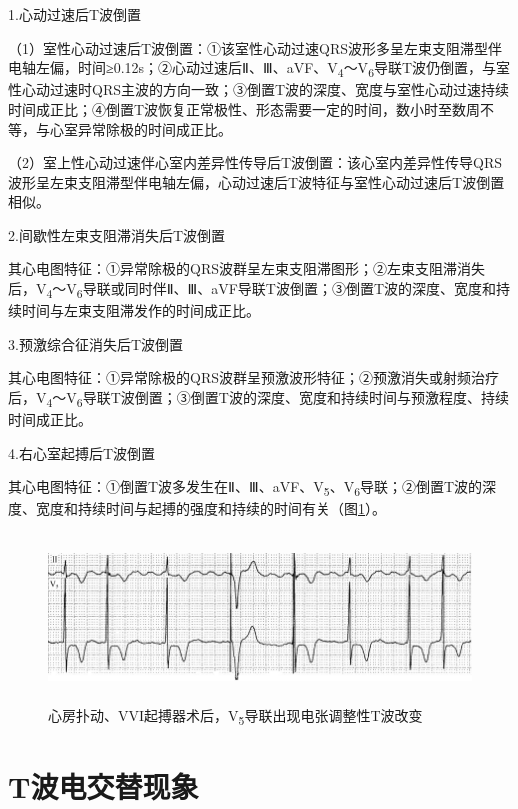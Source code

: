 1.心动过速后T波倒置

（1）室性心动过速后T波倒置：①该室性心动过速QRS波形多呈左束支阻滞型伴电轴左偏，时间≥0.12s；②心动过速后Ⅱ、Ⅲ、aVF、V\textsubscript{4}～V\textsubscript{6}导联T波仍倒置，与室性心动过速时QRS主波的方向一致；③倒置T波的深度、宽度与室性心动过速持续时间成正比；④倒置T波恢复正常极性、形态需要一定的时间，数小时至数周不等，与心室异常除极的时间成正比。

（2）室上性心动过速伴心室内差异性传导后T波倒置：该心室内差异性传导QRS波形呈左束支阻滞型伴电轴左偏，心动过速后T波特征与室性心动过速后T波倒置相似。

2.间歇性左束支阻滞消失后T波倒置

其心电图特征：①异常除极的QRS波群呈左束支阻滞图形；②左束支阻滞消失后，V\textsubscript{4}～V\textsubscript{6}导联或同时伴Ⅱ、Ⅲ、aVF导联T波倒置；③倒置T波的深度、宽度和持续时间与左束支阻滞发作的时间成正比。

3.预激综合征消失后T波倒置

其心电图特征：①异常除极的QRS波群呈预激波形特征；②预激消失或射频治疗后，V\textsubscript{4}～V\textsubscript{6}导联T波倒置；③倒置T波的深度、宽度和持续时间与预激程度、持续时间成正比。

4.右心室起搏后T波倒置

其心电图特征：①倒置T波多发生在Ⅱ、Ⅲ、aVF、V\textsubscript{5}、V\textsubscript{6}导联；②倒置T波的深度、宽度和持续时间与起搏的强度和持续的时间有关（图\ref{fig6-13}）。

\begin{figure}[!htbp]
 \centering
 \includegraphics[width=5.78125in,height=1.75in]{./images/Image00105.jpg}
 \captionsetup{justification=centering}
 \caption{心房扑动、VVI起搏器术后，V\textsubscript{5}导联出现电张调整性T波改变}
 \label{fig6-13}
  \end{figure} 


\protect\hypertarget{text00012.htmlux5cux23subid96}{}{}

\section{T波电交替现象}

